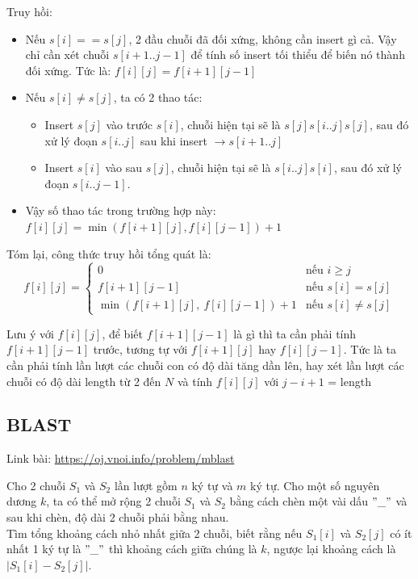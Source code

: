 \documentclass{article}
\begin{document}
Truy hồi:
\begin{itemize}
    \item Nếu $s[i] == s[j]$, 2 đầu chuỗi đã đối xứng, không cần insert gì cả. Vậy chỉ cần xét chuỗi $s[i + 1 .. j - 1]$ để tính số insert tối thiểu để biến nó thành đối xứng. Tức là: $f[i][j] = f[i + 1][j - 1]$
    \item Nếu $s[i] \neq s[j]$, ta có 2 thao tác:
    \begin{itemize}
        \item Insert $s[j]$ vào trước $s[i]$, chuỗi hiện tại sẽ là $s[j]s[i..j]s[j]$, sau đó xử lý đoạn $s[i..j]$ sau khi insert $\rightarrow s[i + 1..j]$
        \item Insert $s[i]$ vào sau $s[j]$, chuỗi hiện tại sẽ là $s[i..j]s[i]$, sau đó xử lý đoạn $s[i..j-1]$.
    \end{itemize}
    \item Vậy số thao tác trong trường hợp này: $f[i][j] = \min(f[i + 1][j], f[i][j - 1]) + 1$
\end{itemize}

Tóm lại, công thức truy hồi tổng quát là:
\[
f[i][j] =
\begin{cases}
0 & \text{nếu } i \geq j \\
f[i+1][j-1] & \text{nếu } s[i] = s[j] \\
\min \left( f[i+1][j],\ f[i][j-1] \right) + 1 & \text{nếu } s[i] \neq s[j]
\end{cases}
\]

Lưu ý với $f[i][j]$, để biết $f[i + 1][j - 1]$ là gì thì ta cần phải tính $f[i + 1][j - 1]$ trước, tương tự với $f[i + 1][j]$ hay $f[i][j - 1]$. Tức là ta cần phải tính lần lượt các chuỗi con có độ dài tăng dần lên, hay xét lần lượt các chuỗi có độ dài length từ 2 đến $N$ và tính $f[i][j]$ với $j - i + 1$ = length

\subsection{BLAST}
Link bài: \url{https://oj.vnoi.info/problem/mblast}

\begin{tcolorbox}[
    colback=blue!5,        %
    colframe=blue!75!black,%
    title={Đề bài}
]
Cho 2 chuỗi $S_1$ và $S_2$ lần lượt gồm $n$ ký tự và $m$ ký tự. Cho một số nguyên dương $k$, ta có thể mở rộng 2 chuỗi $S_1$ và $S_2$ bằng cách chèn một vài dấu $"\_"$ và sau khi chèn, độ dài 2 chuỗi phải bằng nhau.\\

Tìm tổng khoảng cách nhỏ nhất giữa 2 chuỗi, biết rằng nếu $S_1[i]$ và $S_2[j]$ có ít nhất 1 ký tự là $"\_"$ thì khoảng cách giữa chúng là $k$, ngược lại khoảng cách là $|S_1[i] - S_2[j]|$.
\end{tcolorbox}
\end{document}
